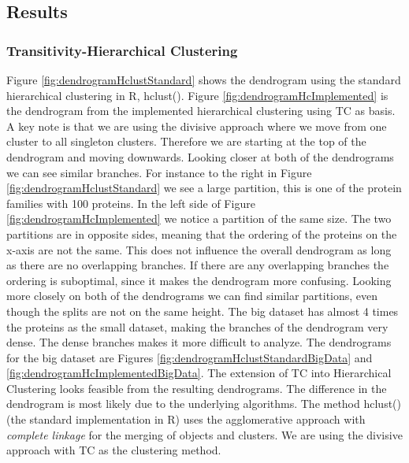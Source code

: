 \documentclass[a4paper,10pt]{article}
\theoremstyle{plain}
\theoremstyle{definition}
\begin{document}
\subsection{Results}

\subsubsection{Transitivity-Hierarchical Clustering}
Figure \ref{fig:dendrogramHclustStandard} shows the dendrogram using the standard hierarchical clustering in R, hclust(). Figure \ref{fig:dendrogramHcImplemented} is the dendrogram from the implemented hierarchical clustering using TC as basis. A key note is that we are using the divisive approach where we move from one cluster to all singleton clusters. Therefore we are starting at the top of the dendrogram and moving downwards. Looking closer at both of the dendrograms we can see similar branches. For instance to the right in Figure \ref{fig:dendrogramHclustStandard} we see a large partition, this is one of the protein families with 100 proteins. In the left side of Figure \ref{fig:dendrogramHcImplemented} we notice a partition of the same size. The two partitions are in opposite sides, meaning that the ordering of the proteins on the x-axis are not the same. This does not influence the overall dendrogram as long as there are no overlapping branches. If there are any overlapping branches the ordering is suboptimal, since it makes the dendrogram more confusing. Looking more closely on both of the dendrograms we can find similar partitions, even though the splits are not on the same height. The big dataset has almost 4 times the proteins as the small dataset, making the branches of the dendrogram very dense. The dense branches makes it more difficult to analyze. The dendrograms for the big dataset are Figures \ref{fig:dendrogramHclustStandardBigData} and \ref{fig:dendrogramHcImplementedBigData}. The extension of TC into Hierarchical Clustering looks feasible from the resulting dendrograms. The difference in the dendrogram is most likely due to the underlying algorithms. The method hclust()(the standard implementation in R) uses the agglomerative approach with \textit{complete linkage} for the merging of objects and clusters. We are using the divisive approach with TC as the clustering method.
\end{document}
